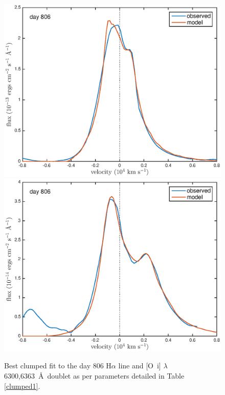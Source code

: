 \documentclass[useAMS,usenatbib,usegraphicx]{mnras}
\begin{document}
\begin{figure}
\begin{center}
\includegraphics[trim =37 10 45 15,clip=true,scale=0.51]{clump_1/best_fit/d806Ha}
\includegraphics[trim =35 10 45 15,clip=true,scale=0.51]{clump_1/best_fit/d806OI}
\caption{Best clumped fit to the day 806 H$\alpha$ line and 
[O~{\sc i}] $\lambda$6300,6363~\AA\ doublet as per parameters detailed in Table 
\ref{clumped1}.}
\label{d806_c}
\end{center}
\end{figure}

\end{document}
